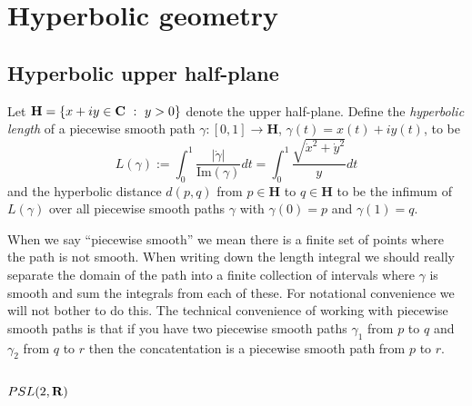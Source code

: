 \documentclass[12pt]{article}
\begin{document}
\newpage

\section{Hyperbolic geometry}

\subsection{Hyperbolic upper half-plane}

\begin{dfn}
  Let $\mathbf{H}=\{x+iy\in\CC\ :\ y>0\}$ denote the upper half-plane. Define the {\em hyperbolic length} of a piecewise smooth path $\gamma\colon[0,1]\to\mathbf{H}$, $\gamma(t)=x(t)+iy(t)$, to be
  \[L(\gamma):=\int_0^1\frac{|\dot{\gamma}|}{\mathrm{Im}(\gamma)}dt=\int_0^1\frac{\sqrt{\dot{x}^2+\dot{y}^2}}{y}dt\]
  and the hyperbolic distance $d(p,q)$ from $p\in\mathbf{H}$ to $q\in\mathbf{H}$ to be the infimum of $L(\gamma)$ over all piecewise smooth paths $\gamma$ with $\gamma(0)=p$ and $\gamma(1)=q$.
\end{dfn}

\begin{rmk}
  When we say ``piecewise smooth'' we mean there is a finite set of points where the path is not smooth. When writing down the length integral we should really separate the domain of the path into a finite collection of intervals where $\gamma$ is smooth and sum the integrals from each of these. For notational convenience we will not bother to do this. The technical convenience of working with piecewise smooth paths is that if you have two piecewise smooth paths $\gamma_1$ from $p$ to $q$ and $\gamma_2$ from $q$ to $r$ then the concatentation is a piecewise smooth path from $p$ to $r$.
\end{rmk}

\subsection{$PSL(2,\mathbf{R})$}
\end{document}
